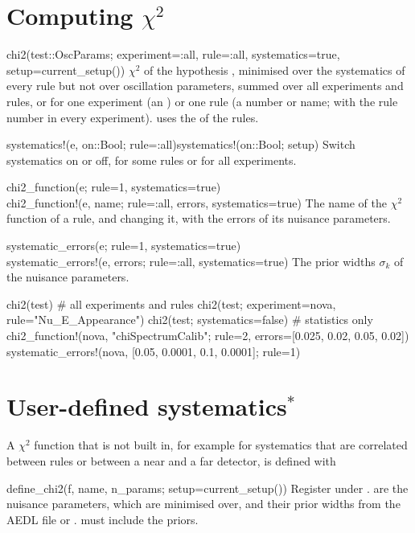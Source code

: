 \section{Computing \texorpdfstring{$\chi^2$}{chi2}}

\begin{apifun}{chi2(test::OscParams; experiment=:all, rule=:all, systematics=true, setup=current\_setup())}
$\chi^2$ of the hypothesis , minimised over the systematics of
every rule but not over oscillation parameters, summed over all experiments
and rules, or for one experiment (an ) or one rule (a number
or name; with  the rule number in every experiment).
 uses the  of the rules.
\end{apifun}
\begin{apifun}{systematics!(e, on::Bool; rule=:all)\qquad systematics!(on::Bool; setup)}
Switch systematics on or off, for some rules or for all experiments.
\end{apifun}
\begin{apifun}{chi2\_function(e; rule=1, systematics=true)\\
chi2\_function!(e, name; rule=:all, errors, systematics=true)}
The name of the $\chi^2$ function of a rule, and changing it, with the errors
of its nuisance parameters.
\end{apifun}
\begin{apifun}{systematic\_errors(e; rule=1, systematics=true)\\
systematic\_errors!(e, errors; rule=:all, systematics=true)}
The prior widths $\sigma_k$ of the nuisance parameters.
\end{apifun}

\begin{julia}
chi2(test)                                   # all experiments and rules
chi2(test; experiment=nova, rule="Nu_E_Appearance")
chi2(test; systematics=false)                # statistics only
chi2_function!(nova, "chiSpectrumCalib"; rule=2, errors=[0.025, 0.02, 0.05, 0.02])
systematic_errors!(nova, [0.05, 0.0001, 0.1, 0.0001]; rule=1)
\end{julia}

\section{User-defined systematics\texorpdfstring{$^\ast$}{*}}\label{sec:userchi2}

A $\chi^2$ function that is not built in, for example for systematics that are
correlated between rules or between a near and a far detector, is defined with
\begin{apifun}{define\_chi2(f, name, n\_params; setup=current\_setup())}
Register  under
.  are the  nuisance parameters, which are
minimised over, and  their prior widths from the AEDL file or
.  must include the priors.
\end{apifun}

